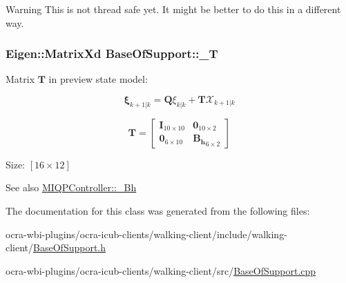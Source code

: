 \begin{DoxyWarning}{\-Warning}
\-This is not thread safe yet. \-It might be better to do this in a different way. 
\end{DoxyWarning}
\hypertarget{classBaseOfSupport_a52f07f15e1667eb7876e614dcd817ef1}{
\subsubsection[{\-\_\-\-T}]{\setlength{\rightskip}{0pt plus 5cm}\-Eigen\-::\-Matrix\-Xd {\bf \-Base\-Of\-Support\-::\-\_\-\-T}}}\label{classBaseOfSupport_a52f07f15e1667eb7876e614dcd817ef1}
\-Matrix $\mathbf{T}$ in preview state model\-:

\[ \mathbf{\xi}_{k+1|k} = \mathbf{Q} \xi_{k|k} + \mathbf{T}\mathcal{X}_{k+1|k} \]

\[ \mathbf{T} = \left[\begin{array}{cc} \mathbf{I}_{10\times10} & \mathbf{0}_{10\times2}\\ \mathbf{0}_{6\times10} & \mathbf{B_h}_{6\times2} \end{array}\right] \]

\-Size\-: $[16\times12]$ \begin{DoxySeeAlso}{\-See also}
\hyperlink{classMIQPController_a9a989875871a898f0ad19b441a2c67ba}{\-M\-I\-Q\-P\-Controller\-::\-\_\-\-Bh} 
\end{DoxySeeAlso}


\-The documentation for this class was generated from the following files\-:\begin{DoxyCompactItemize}
\item 
ocra-\/wbi-\/plugins/ocra-\/icub-\/clients/walking-\/client/include/walking-\/client/\hyperlink{BaseOfSupport_8h}{\-Base\-Of\-Support.\-h}\item 
ocra-\/wbi-\/plugins/ocra-\/icub-\/clients/walking-\/client/src/\hyperlink{BaseOfSupport_8cpp}{\-Base\-Of\-Support.\-cpp}\end{DoxyCompactItemize}
